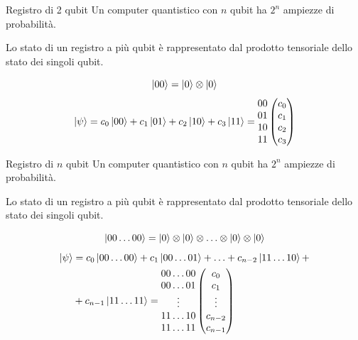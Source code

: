 \documentclass{beamer}
\begin{document}
    \begin{frame}{Registro di 2 qubit}
        Un computer quantistico con $n$ qubit ha $2^n$ ampiezze di probabilità. 

        Lo stato di un registro a più qubit è rappresentato dal prodotto tensoriale dello stato dei singoli qubit. 

        \begin{equation*}
            \ket{00} = \ket{0} \otimes \ket{0}
        \end{equation*}
        \begin{equation*}
            \ket{\psi} = c_0 \ket{00} + c_1 \ket{01} + c_2 \ket{10} + c_3 \ket{11} = 
            \begin{matrix}
                00 \\ 01 \\ 10 \\ 11
            \end{matrix} \begin{pmatrix}
                c_0 \\ c_1 \\ c_2 \\ c_3
            \end{pmatrix}
        \end{equation*}
    \end{frame}

    \begin{frame}{Registro di $n$ qubit}
        Un computer quantistico con $n$ qubit ha $2^n$ ampiezze di probabilità. 

        Lo stato di un registro a più qubit è rappresentato dal prodotto tensoriale dello stato dei singoli qubit. 

        \begin{equation*}
            \ket{00\ldots00} = \ket{0} \otimes \ket{0} \otimes \ldots \otimes \ket{0} \otimes \ket{0}
        \end{equation*}
        \begin{equation*}
            \begin{split}
                \ket{\psi} &= c_0 \ket{00\ldots00} + c_1 \ket{00\ldots01} + \ldots + c_{n-2} \ket{11\ldots10} + \\ 
                &+ c_{n-1} \ket{11\ldots11} = \begin{matrix}
                00\ldots00 \\ 00\ldots01 \\ \vdots \\ 11\ldots10 \\ 11\ldots11
            \end{matrix} \begin{pmatrix}
                c_0 \\ c_1 \\ \vdots \\ c_{n-2} \\ c_{n-1}
            \end{pmatrix}
            \end{split}
        \end{equation*}
    \end{frame}
\end{document}
